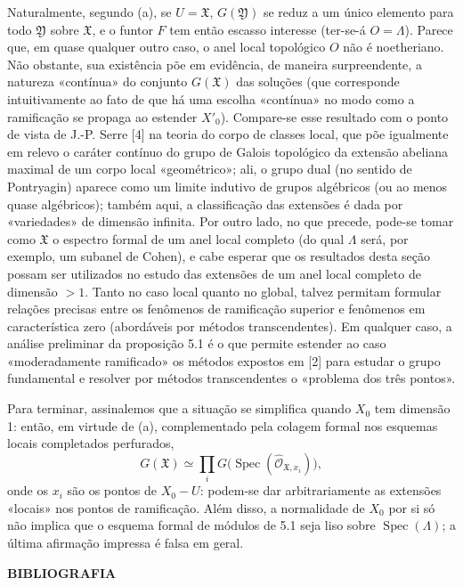 \documentclass[11pt,twoside,openany]{book}
\numberwithin{equation}{section}
\newcommand{\src}[1]{%
  \phantomsection\hypertarget{src:#1}{}%
  \marginpar{\raggedleft\footnotesize\sffamily #1}%
}
\theoremstyle{plain}
\theoremstyle{definition}
\theoremstyle{remark}
\newcommand{\FgaUnitKey}{frontmatter}
\renewcommand{\src}[1]{%
  \phantomsection\hypertarget{src:\FgaUnitKey:#1}{}%
  \marginpar{\raggedleft\footnotesize\sffamily #1}%
}
\begin{document}
Naturalmente, segundo (a), se $U=\mathfrak X$, $G(\mathfrak Y)$ se reduz a um
único elemento para todo $\mathfrak Y$ sobre $\mathfrak X$, e o funtor $F$
tem então escasso interesse (ter-se-á $O=\Lambda$). Parece que, em quase
qualquer outro caso, o anel local topológico $O$ não é noetheriano. Não
obstante, sua existência põe em evidência, de maneira surpreendente, a
natureza «contínua» do conjunto $G(\mathfrak X)$ das soluções (que
corresponde intuitivamente ao fato de que há uma escolha «contínua» no
modo como a ramificação se propaga ao estender $X'_0$). Compare-se esse
resultado com o ponto de vista de J.-P. Serre [4] na teoria do corpo de
classes local, que põe igualmente em relevo o caráter contínuo do grupo de
Galois topológico da extensão abeliana maximal de um corpo local
«geométrico»; ali, o grupo dual (no sentido de Pontryagin) aparece como um
limite indutivo de grupos algébricos (ou ao menos quase algébricos); também
aqui, a classificação das extensões é dada por «variedades» de
dimensão infinita. Por outro lado, no que precede, pode-se tomar como
$\mathfrak X$ o espectro formal de um anel local completo (do qual
$\Lambda$ será, por exemplo, um subanel de Cohen), e cabe esperar que os
resultados desta seção possam ser utilizados no estudo das extensões
de um anel local completo de dimensão $>1$. Tanto no caso local quanto no
global, talvez permitam formular relações precisas entre os fenômenos de
ramificação superior e fenômenos em característica zero (abordáveis por
métodos transcendentes). Em qualquer caso, a análise preliminar da
proposição 5.1 é o que permite estender ao caso «moderadamente ramificado»
os métodos expostos em [2] para estudar o grupo fundamental e resolver por
métodos transcendentes o «problema dos três pontos».

Para terminar, assinalemos que a situação se simplifica quando $X_0$ tem dimensão 1: então, em virtude de (a), complementado pela colagem formal nos esquemas locais completados perfurados,
\[
  G(\mathfrak X)\simeq
  \prod_iG\bigl(\operatorname{Spec}(\widehat{\mathcal O}_{\mathfrak X,x_i})\bigr),
\]
onde os $x_i$ são os pontos de $X_0-U$: podem-se dar arbitrariamente as
extensões «locais» nos pontos de ramificação. Além disso, a normalidade de $X_0$ por si só não implica que o esquema formal de módulos de 5.1 seja liso sobre $\operatorname{Spec}(\Lambda)$; a última afirmação impressa é falsa em geral.

\src{390}
\begin{center}
  \textbf{BIBLIOGRAFIA}
\end{center}
\end{document}
